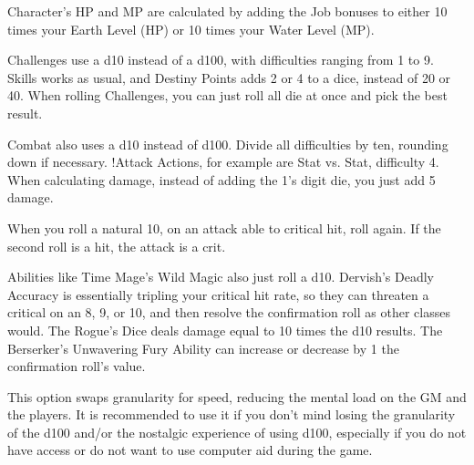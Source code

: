 \begin{multicols}{2}
Character’s HP and MP are calculated by
adding the Job bonuses to either 10 times your
Earth Level (HP) or 10 times your Water Level
(MP).

Challenges use a d10 instead of a d100,
with difficulties ranging from 1 to 9. Skills works
as usual, and Destiny Points adds 2 or 4 to a dice,
instead of 20 or 40. When rolling Challenges, you
can just roll all die at once and pick the best result.

Combat also uses a d10 instead of d100.
Divide all difficulties by ten, rounding down if
necessary. !Attack Actions, for example are Stat
vs. Stat, difficulty 4. When calculating damage,
instead of adding the 1's digit die, you just add 5
damage.

When you roll a natural 10, on an attack
able to critical hit, roll again. If the second roll is
a hit, the attack is a crit.

Abilities like Time Mage’s Wild Magic
also just roll a d10. Dervish's Deadly Accuracy is
essentially tripling your critical hit rate, so they
can threaten a critical on an 8, 9, or 10, and then
resolve the confirmation roll as other classes
would. The Rogue’s Dice deals damage equal to
10 times the d10 results. The Berserker’s
Unwavering Fury Ability can increase or
decrease by 1 the confirmation roll’s value.

This option swaps granularity for speed,
reducing the mental load on the GM and the
players. It is recommended to use it if you don’t
mind losing the granularity of the d100 and/or
the nostalgic experience of using d100, especially
if you do not have access or do not want to use
computer aid during the game.

\end{multicols}
